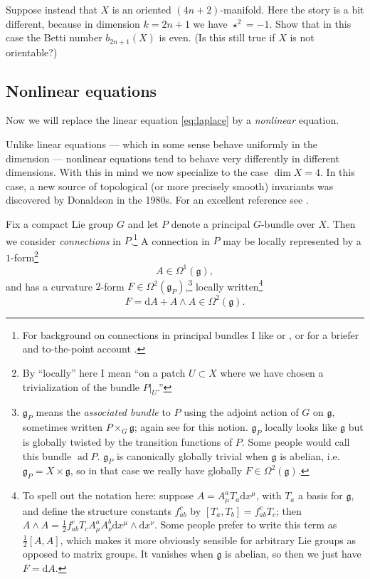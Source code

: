\documentclass[12pt,letterpaper,reqno]{article}
\numberwithin{equation}{section}
\newcommand{\fg}{{\mathfrak g}}
\newcommand{\half}{\ensuremath{\frac{1}{2}}}
\newcommand{\de}{\mathrm{d}}
\newcommand{\ti}[1]{\textit{#1}}
\DeclareMathOperator{\ad}{ad}
\begin{document}
\begin{exercise} Suppose instead that $X$ is an oriented  $(4n+2)$-manifold. Here the story is a bit different, because in dimension $k = 2n+1$
we have $\star^2 = -1$.
Show that in this case the Betti number $b_{2n+1}(X)$ is even.
(Is this still true if $X$ is not orientable?)
\end{exercise}


\subsection{Nonlinear equations}

Now we will replace the linear equation
\eqref{eq:laplace} by a \ti{nonlinear} equation.

Unlike linear equations --- which in some sense behave uniformly
in the dimension --- nonlinear equations tend to behave very
differently in different dimensions. With this in mind
we now specialize to the case $\dim X = 4$.
In this case, a new source of topological
(or more precisely smooth) invariants was discovered
by Donaldson in the 1980s. For an excellent reference see \cite{MR1079726}.

Fix a compact Lie group $G$ and let $P$ denote a principal $G$-bundle over $X$. Then
we consider \ti{connections} in $P$.\footnote{For background on connections in principal
bundles I like \cite{spivak} or \cite{Kobayashi1996a}, or for a briefer and to-the-point 
account \cite{Freed1992}.}
A connection in $P$ may be locally represented by a $1$-form\footnote{By ``locally'' here I mean ``on a patch $U \subset X$ where we
have chosen a trivialization of the bundle $P \vert_U$.''}
\begin{equation}
  A \in \Omega^1(\fg),
\end{equation}
and has a curvature $2$-form $F \in \Omega^2(\fg_P)$,\footnote{$\fg_P$ means the \ti{associated bundle} to $P$ using the
adjoint action of $G$ on $\fg$, sometimes written $P \times_G \fg$; 
again see \cite{spivak} for this notion. 
$\fg_P$ locally looks like $\fg$ but is globally twisted
by the transition functions of $P$. Some people would call this bundle $\ad P$. 
$\fg_P$ is canonically globally trivial when $\fg$ is abelian, i.e. $\fg_P = X \times \fg$,
so in that case we really have globally $F \in \Omega^2(\fg)$.} 
locally written\footnote{To spell out the 
notation here: suppose $A = A_\mu^a T_a \de x^\mu$, with $T_a$ a basis for $\fg$, and define the structure constants
$f_{ab}^c$ by $[T_a, T_b] = f_{ab}^c T_c$; then $A \wedge A = \half f_{ab}^c T_c A_\mu^a A_\nu^b \de x^\mu \wedge \de x^\nu$.
Some people prefer to write this term as $\half [A,A]$, which makes it more obviously sensible
for arbitrary Lie groups as opposed to matrix groups. It vanishes when $\fg$ is abelian, so then we just have
$F = \de A$.}
\begin{equation} \label{eq:curvature}
  F = \de A + A \wedge A \in \Omega^2(\fg).
\end{equation}
\end{document}
